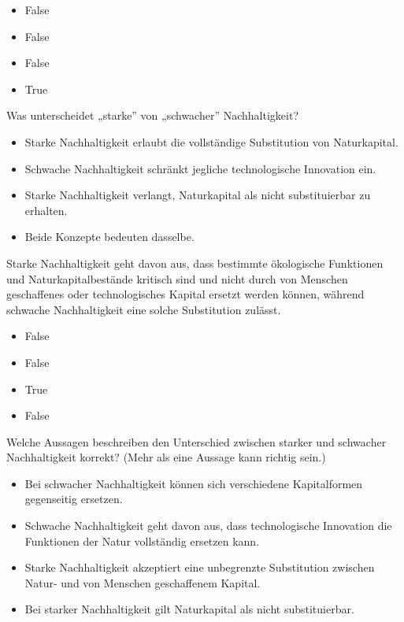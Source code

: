 \documentclass[
  nswissgerman,
  a4paper,
  DIV=11,
  numbers=noendperiod,
  oneside,
  openany]{scrreprt}
\providecommand{\tightlist}{%
  \setlength{\itemsep}{0pt}\setlength{\parskip}{0pt}}
\begin{document}
\begin{itemize}
\tightlist
\item
  False
\item
  False
\item
  False
\item
  True
\end{itemize}

Was unterscheidet „starke'' von „schwacher'' Nachhaltigkeit?

\begin{itemize}
\tightlist
\item[$\square$]
  Starke Nachhaltigkeit erlaubt die vollständige Substitution von
  Naturkapital.
\item[$\square$]
  Schwache Nachhaltigkeit schränkt jegliche technologische Innovation
  ein.
\item[$\square$]
  Starke Nachhaltigkeit verlangt, Naturkapital als nicht substituierbar
  zu erhalten.
\item[$\square$]
  Beide Konzepte bedeuten dasselbe.
\end{itemize}

Starke Nachhaltigkeit geht davon aus, dass bestimmte ökologische
Funktionen und Naturkapitalbestände kritisch sind und nicht durch von
Menschen geschaffenes oder technologisches Kapital ersetzt werden
können, während schwache Nachhaltigkeit eine solche Substitution
zulässt.

\begin{itemize}
\tightlist
\item
  False
\item
  False
\item
  True
\item
  False
\end{itemize}

Welche Aussagen beschreiben den Unterschied zwischen starker und
schwacher Nachhaltigkeit korrekt? (Mehr als eine Aussage kann richtig
sein.)

\begin{itemize}
\tightlist
\item[$\square$]
  Bei schwacher Nachhaltigkeit können sich verschiedene Kapitalformen
  gegenseitig ersetzen.
\item[$\square$]
  Schwache Nachhaltigkeit geht davon aus, dass technologische Innovation
  die Funktionen der Natur vollständig ersetzen kann.
\item[$\square$]
  Starke Nachhaltigkeit akzeptiert eine unbegrenzte Substitution
  zwischen Natur- und von Menschen geschaffenem Kapital.
\item[$\square$]
  Bei starker Nachhaltigkeit gilt Naturkapital als nicht substituierbar.
\end{itemize}
\end{document}
